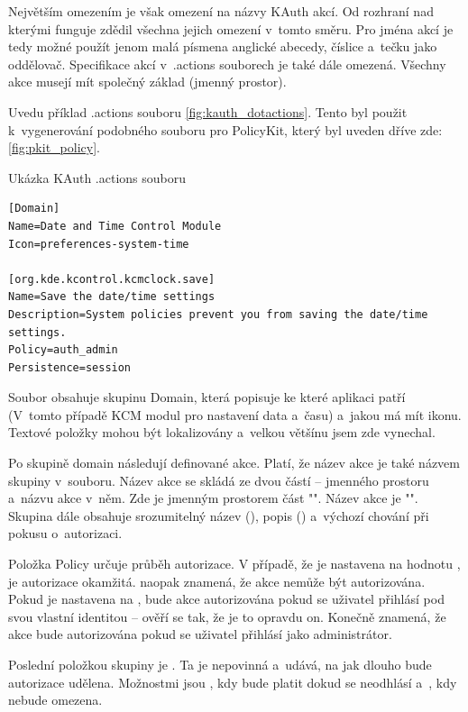 {Největším omezením je však omezení na názvy KAuth akcí. Od rozhraní nad kterými funguje zdědil všechna jejich omezení v~tomto směru. Pro jména akcí je tedy možné použít jenom malá písmena anglické abecedy, číslice a~tečku jako oddělovač. Specifikace akcí v~.actions souborech je také dále omezená. Všechny akce musejí mít společný základ (jmenný prostor).

Uvedu příklad .actions souboru \ref{fig:kauth_dotactions}. Tento byl použit k~vygenerování podobného souboru pro PolicyKit, který byl uveden dříve zde: \ref{fig:pkit_policy}.

\begin{mylisting}
\caption{Ukázka KAuth .actions souboru}
\label{fig:kauth_dotactions}
\begin{lstlisting}
[Domain]
Name=Date and Time Control Module
Icon=preferences-system-time

[org.kde.kcontrol.kcmclock.save]
Name=Save the date/time settings
Description=System policies prevent you from saving the date/time settings.
Policy=auth_admin
Persistence=session
\end{lstlisting}
\end{mylisting}

Soubor obsahuje skupinu Domain, která popisuje ke které aplikaci patří (V~tomto případě KCM modul pro nastavení data a~času) a~jakou má mít ikonu. Textové položky mohou být lokalizovány a~velkou většínu jsem zde vynechal.

Po skupině domain následují definované akce. Platí, že název akce je také názvem skupiny v~souboru. Název akce se skládá ze dvou částí -- jmenného prostoru a~názvu akce v~něm. Zde je jmenným prostorem část "". Název akce je "". Skupina dále obsahuje srozumitelný název (), popis () a~výchozí chování při pokusu o~autorizaci.

Položka Policy určuje průběh autorizace. V případě, že je nastavena na hodnotu , je autorizace okamžitá.  naopak znamená, že akce nemůže být autorizována. Pokud je nastavena na , bude akce autorizována pokud se uživatel přihlásí pod svou vlastní identitou -- ověří se tak, že je to opravdu on. Konečně  znamená, že akce bude autorizována pokud se uživatel přihlásí jako administrátor.

Poslední položkou skupiny je . Ta je nepovinná a~udává, na jak dlouho bude autorizace udělena. Možnostmi jsou , kdy bude platit dokud se neodhlásí a~, kdy nebude omezena.

}
